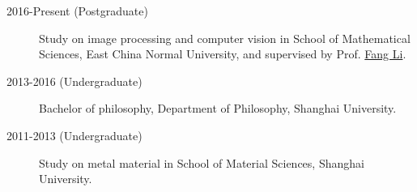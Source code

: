 \begin{description}
    \item[2016-Present (Postgraduate)]Study on image processing and computer vision in School of Mathematical Sciences, East China Normal University, and supervised by Prof. \href{http://math.ecnu.edu.cn/~fli/}{\textsf{Fang Li}}.
    \item[2013-2016 (Undergraduate)] Bachelor of philosophy, Department of Philosophy, Shanghai University.
    \item[2011-2013 (Undergraduate)] Study on metal material in School of Material Sciences, Shanghai University.
\end{description}
